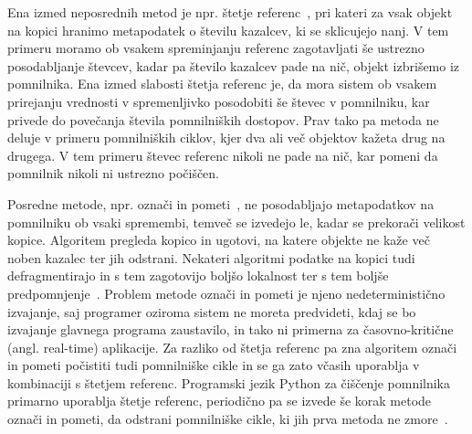Ena izmed neposrednih metod je npr. štetje referenc~\cite{collins1960method}, pri kateri za vsak objekt na kopici hranimo metapodatek o številu kazalcev, ki se sklicujejo nanj. V tem primeru moramo ob vsakem spreminjanju referenc zagotavljati še ustrezno posodabljanje števcev, kadar pa število kazalcev pade na nič, objekt izbrišemo iz pomnilnika. Ena izmed slabosti štetja referenc je, da mora sistem ob vsakem prirejanju vrednosti v spremenljivko posodobiti še števec v pomnilniku, kar privede do povečanja števila pomnilniških dostopov. Prav tako pa metoda ne deluje v primeru pomnilniških ciklov, kjer dva ali več objektov kažeta drug na drugega. V tem primeru števec referenc nikoli ne pade na nič, kar pomeni da pomnilnik nikoli ni ustrezno počiščen.

Posredne metode, npr. označi in pometi~\cite{mccarthy1960recursive}, ne posodabljajo metapodatkov na pomnilniku ob vsaki spremembi, temveč se izvedejo le, kadar se prekorači velikost kopice. Algoritem pregleda kopico in ugotovi, na katere objekte ne kaže več noben kazalec ter jih odstrani. Nekateri algoritmi podatke na kopici tudi defragmentirajo in s tem zagotovijo boljšo lokalnost ter s tem boljše predpomnjenje~\cite{fenichel1969lisp}. Problem metode označi in pometi je njeno nedeterministično izvajanje, saj programer oziroma sistem ne moreta predvideti, kdaj se bo izvajanje glavnega programa zaustavilo, in tako ni primerna za časovno-kritične (angl. real-time) aplikacije. Za razliko od štetja referenc pa zna algoritem označi in pometi počistiti tudi pomnilniške cikle in se ga zato včasih uporablja v kombinaciji s štetjem referenc. Programski jezik Python za čiščenje pomnilnika primarno uporablja štetje referenc, periodično pa se izvede še korak metode označi in pometi, da odstrani pomnilniške cikle, ki jih prva metoda ne zmore~\cite{van2007python}.